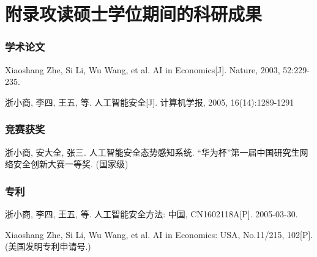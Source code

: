 \newpage
\songti\xiaosi
\chapter*{\heiti\sanhao\textbf{附录\quad 攻读硕士学位期间的科研成果}}
%

  \subsection*{学术论文}

  \begin{achievements}
    \item Xiaoshang Zhe, Si Li, Wu Wang, et al. AI in Economics[J]. Nature, 2003, 52:229-235.
    \item 浙小商, 李四, 王五, 等. 人工智能安全[J]. 计算机学报, 2005, 16(14):1289-1291
  \end{achievements}

  \subsection*{竞赛获奖}
  \begin{achievements}
    \item 浙小商, 安大全, 张三. 人工智能安全态势感知系统. “华为杯”第一届中国研究生网络安全创新大赛一等奖. (国家级)
  \end{achievements}

  \subsection*{专利}
  \begin{achievements}
    \item 浙小商, 李四, 王五, 等. 人工智能安全方法: 中国, CN1602118A[P]. 2005-03-30.
    \item Xiaoshang Zhe, Si Li, Wu Wang, et al. AI in Economics: USA, No.11/215, 102[P]. (美国发明专利申请号.)
  \end{achievements}

